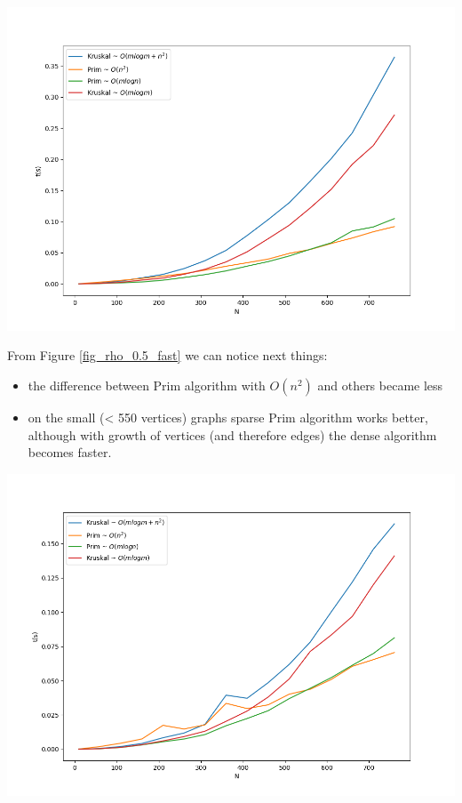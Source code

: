 \begin{center}
    \includegraphics[width=0.75\linewidth]{../results/rho_0.5_fast.png}
    \label{fig_rho_0.5_fast}
\end{center}

From Figure \ref{fig_rho_0.5_fast} we can notice next things:

\begin{itemize}
    \item the difference between Prim algorithm with $O(n^2)$ and others became less
    \item on the small (< 550 vertices) graphs sparse Prim algorithm works better, although with growth of vertices (and therefore edges) the dense  algorithm becomes faster. 
\end{itemize}

\begin{center}
    \includegraphics[width=0.75\linewidth]{../results/rho_0.25_fast.png}
    \label{fig_rho_0.25_fast}
\end{center}

